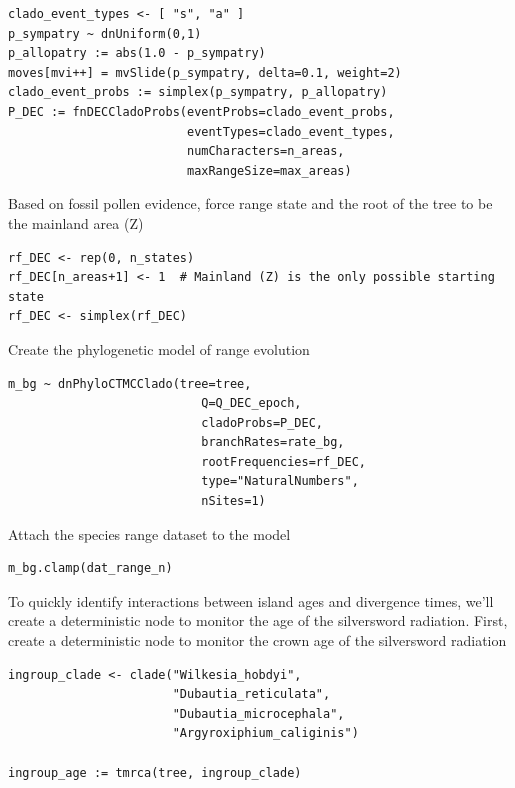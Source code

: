 \begin{snugshade}
\begin{lstlisting}
clado_event_types <- [ "s", "a" ]
p_sympatry ~ dnUniform(0,1)
p_allopatry := abs(1.0 - p_sympatry)
moves[mvi++] = mvSlide(p_sympatry, delta=0.1, weight=2)
clado_event_probs := simplex(p_sympatry, p_allopatry)
P_DEC := fnDECCladoProbs(eventProbs=clado_event_probs,
                         eventTypes=clado_event_types,
                         numCharacters=n_areas,
                         maxRangeSize=max_areas)
\end{lstlisting}
\end{snugshade}

Based on fossil pollen evidence, force range state and the root of the tree to be the mainland area (Z)

\begin{snugshade}
\begin{lstlisting}
rf_DEC <- rep(0, n_states)
rf_DEC[n_areas+1] <- 1  # Mainland (Z) is the only possible starting state
rf_DEC <- simplex(rf_DEC)
\end{lstlisting}
\end{snugshade}


Create the phylogenetic model of range evolution

\begin{snugshade}
\begin{lstlisting}
m_bg ~ dnPhyloCTMCClado(tree=tree,
                           Q=Q_DEC_epoch,
                           cladoProbs=P_DEC,
                           branchRates=rate_bg,
                           rootFrequencies=rf_DEC,
                           type="NaturalNumbers",
                           nSites=1)        
\end{lstlisting}
\end{snugshade}


Attach the species range dataset to the model

\begin{snugshade}
\begin{lstlisting}
m_bg.clamp(dat_range_n)
\end{lstlisting}
\end{snugshade}


To quickly identify interactions between island ages and divergence times, we'll create a deterministic node to monitor the age of the silversword radiation.
First, create a deterministic node to monitor the crown age of the silversword radiation

\begin{snugshade}
\begin{lstlisting}
ingroup_clade <- clade("Wilkesia_hobdyi",
                       "Dubautia_reticulata",
                       "Dubautia_microcephala",
                       "Argyroxiphium_caliginis")

ingroup_age := tmrca(tree, ingroup_clade)
\end{lstlisting}
\end{snugshade}

